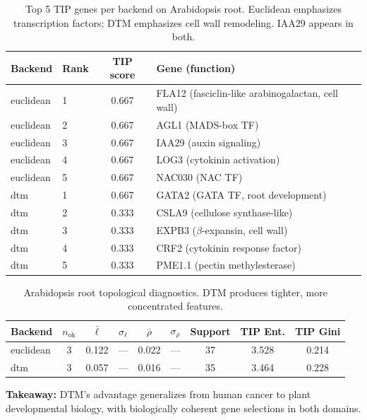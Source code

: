 \documentclass[12pt]{article}
\begin{document}
\begin{table}[h]
\centering\small
\begin{tabular}{llcl}
\toprule
Backend & Rank & TIP score & Gene (function) \\
\midrule
euclidean & 1 & 0.667 & FLA12 (fasciclin-like arabinogalactan, cell wall) \\
euclidean & 2 & 0.667 & AGL1 (MADS-box TF) \\
euclidean & 3 & 0.667 & IAA29 (auxin signaling) \\
euclidean & 4 & 0.667 & LOG3 (cytokinin activation) \\
euclidean & 5 & 0.667 & NAC030 (NAC TF) \\
\midrule
dtm & 1 & 0.667 & GATA2 (GATA TF, root development) \\
dtm & 2 & 0.333 & CSLA9 (cellulose synthase-like) \\
dtm & 3 & 0.333 & EXPB3 ($\beta$-expansin, cell wall) \\
dtm & 4 & 0.333 & CRF2 (cytokinin response factor) \\
dtm & 5 & 0.333 & PME1.1 (pectin methylesterase) \\
\bottomrule
\end{tabular}
\caption{Top 5 TIP genes per backend on Arabidopsis root. Euclidean emphasizes transcription factors; DTM emphasizes cell wall remodeling. IAA29 appears in both.}
\label{tab:arab_genes}
\end{table}

\begin{table}[h]
\centering\small
\begin{tabular}{@{}lcccccccc@{}}
\toprule
Backend & $n_{\text{ok}}$ & $\bar{\ell}$ & $\sigma_\ell$ & $\bar{\rho}$ & $\sigma_\rho$ & Support & TIP Ent. & TIP Gini \\
\midrule
euclidean & 3 & 0.122 & --- & 0.022 & --- & 37 & 3.528 & 0.214 \\
dtm & 3 & 0.057 & --- & 0.016 & --- & 35 & 3.464 & 0.228 \\
\bottomrule
\end{tabular}
\caption{Arabidopsis root topological diagnostics. DTM produces tighter, more concentrated features.}
\label{tab:diag_arab}
\end{table}

\textbf{Takeaway:} DTM's advantage generalizes from human cancer to plant developmental biology, with biologically coherent gene selections in both domains.

\end{document}
